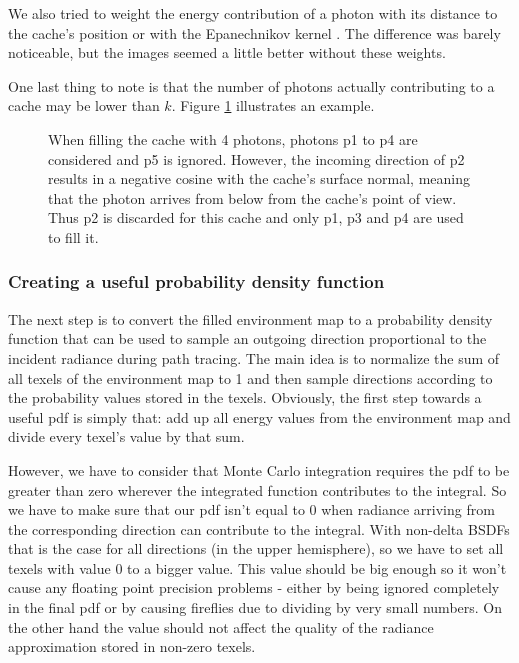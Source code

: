 We also tried to weight the energy contribution of a photon with its distance to the cache's position or with the Epanechnikov kernel \cite[chapter 8]{epanechnikov}. The difference was barely noticeable, but the images seemed a little better without these weights.

One last thing to note is that the number of photons actually contributing to a cache may be lower than $k$. Figure \ref{fill_cache_cos} illustrates an example.

\begin{figure}[ht]
	\centering
\def\svgwidth{250pt}
  
	\caption{When filling the cache with 4 photons, photons p1 to p4 are considered and p5 is ignored. However, the incoming direction of p2 results in a negative cosine with the cache's surface normal, meaning that the photon arrives from below from the cache's point of view. Thus p2 is discarded for this cache and only p1, p3 and p4 are used to fill it.}
	\label{fill_cache_cos}
\end{figure}


\newpage
\subsubsection{Creating a useful probability density function}
The next step is to convert the filled environment map to a probability density function that can be used to sample an outgoing direction proportional to the incident radiance during path tracing. The main idea is to normalize the sum of all texels of the environment map to 1 and then sample directions according to the probability values stored in the texels. Obviously, the first step towards a useful pdf is simply that: add up all energy values from the environment map and divide every texel's value by that sum.

However, we have to consider that Monte Carlo integration requires the pdf to be greater than zero wherever the integrated function contributes to the integral. So we have to make sure that our pdf isn't equal to 0 when radiance arriving from the corresponding direction can contribute to the integral. With non-delta BSDFs that is the case for all directions (in the upper hemisphere), so we have to set all texels with value 0 to a bigger value. This value should be big enough so it won't cause any floating point precision problems - either by being ignored completely in the final pdf or by causing fireflies due to dividing by very small numbers. On the other hand the value should not affect the quality of the radiance approximation stored in non-zero texels.

